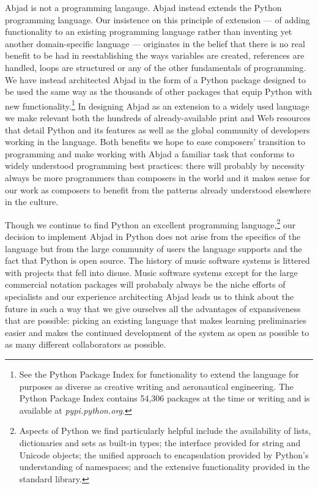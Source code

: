 \documentclass{article}
\begin{document}
Abjad is not a programming langauge. Abjad instead extends the Python
programming language. Our insistence on this principle of extension --- of
adding functionality to an existing programming language rather than inventing
yet another domain-specific language --- originates in the belief that there is
no real benefit to be had in reestablishing the ways variables are created,
references are handled, loops are structured or any of the other fundamentals
of programming. We have instead architected Abjad in the form of a Python
package designed to be used the same way as the thousands of other packages
that equip Python with new functionality.\footnote{See the Python Package Index
for functionality to extend the language for purposes as diverse as creative
writing and aeronautical engineering. The Python Package Index contains 54,306
packages at the time or writing and is available at \textit{pypi.python.org}.}
In designing Abjad as an extension to a widely used language we make relevant
both the hundreds of already-available print and Web resources that detail
Python and its features as well as the global community of developers working
in the language. Both benefits we hope to ease composers' transition to
programming and make working with Abjad a familiar task that conforms to widely
understood programming best practices: there will probably by necessity always
be more programmers than composers in the world and it makes sense for our work
as composers to benefit from the patterns already understood elsewhere in the
culture.

Though we continue to find Python an excellent programming
language,\footnote{Aspects of Python we find particularly helpful include the
availability of lists, dictionaries and sets as built-in types; the interface
provided for string and Unicode objects; the unified approach to encapsulation
provided by Python's understanding of namespaces; and the extensive
functionality provided in the standard library.} our decision to implement
Abjad in Python does not arise from the specifics of the language but from the
large community of users the language supports and the fact that Python is open
source. The history of music software systems is littered with projects that
fell into disuse. Music software systems except for the large commercial
notation packages will probabaly always be the niche efforts of specialists and
our experience architecting Abjad leads us to think about the future in such a
way that we give ourselves all the advantages of expansiveness that are
possible: picking an existing language that makes learning preliminaries
easier and makes the continued development of the system as open as possible to
as many different collaborators as possible.
\end{document}

